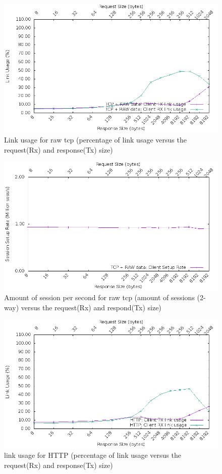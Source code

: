 \begin{figure}[H]
  \includegraphics[scale=0.6]{images/raw_link_usage.png}
  \caption{Link usage for raw tcp (percentage of link usage versus the request(Rx) and response(Tx) size)}
  \label{fig:rawtcplink}
\end{figure}

\begin{figure}[H]
  \includegraphics[scale=0.6]{images/raw_setup.png}
  \caption{Amount of session per second for raw tcp (amount of sessions (2-way) versus the request(Rx) and respond(Tx) size)}
  \label{fig:rawtcpsession}
\end{figure}

\begin{figure}[H]
  \includegraphics[scale=0.6]{images/http_link_usage.png}
  \caption{link usage for HTTP  (percentage of link usage versus the request(Rx) and response(Tx) size)}
  \label{fig:httplink}
\end{figure}

